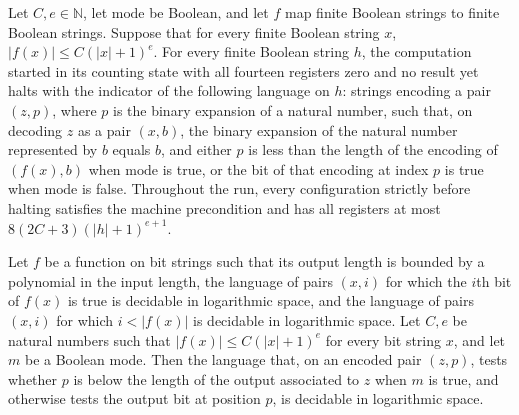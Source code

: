 \begin{lemma}
\label{Complexity.comp_run}
\leanok
{}
Let $C,e\in\mathbb{N}$, let $\mathrm{mode}$ be Boolean, and let $f$ map finite Boolean
strings to finite Boolean strings. Suppose that for every finite Boolean string $x$,
$|f(x)|\le C(|x|+1)^e$. For every finite Boolean string $h$, the computation started in
its counting state with all fourteen registers zero and no result yet halts with the
indicator of the following language on $h$: strings encoding a pair $(z,p)$, where $p$
is the binary expansion of a natural number, such that, on decoding $z$ as a pair
$(x,b)$, the binary expansion of the natural number represented by $b$ equals $b$, and
either $p$ is less than the length of the encoding of $(f(x),b)$ when $\mathrm{mode}$ is
true, or the bit of that encoding at index $p$ is true when $\mathrm{mode}$ is false.
Throughout the run, every configuration strictly before halting satisfies the machine
precondition and has all registers at most $8(2C+3)(|h|+1)^{e+1}$.
\end{lemma}

\begin{lemma}
\label{Complexity.comp_mem}
\leanok
{}
Let $f$ be a function on bit strings such that its output length is bounded by a
polynomial in the input length, the language of pairs $(x,i)$ for which the $i$th bit of
$f(x)$ is true is decidable in logarithmic space, and the language of pairs $(x,i)$ for
which $i<|f(x)|$ is decidable in logarithmic space. Let $C,e$ be natural numbers such
that $|f(x)|\le C(|x|+1)^e$ for every bit string $x$, and let $m$ be a Boolean mode.
Then the language that, on an encoded pair $(z,p)$, tests whether $p$ is below the
length of the output associated to $z$ when $m$ is true, and otherwise tests the output
bit at position $p$, is decidable in logarithmic space.
\end{lemma}

